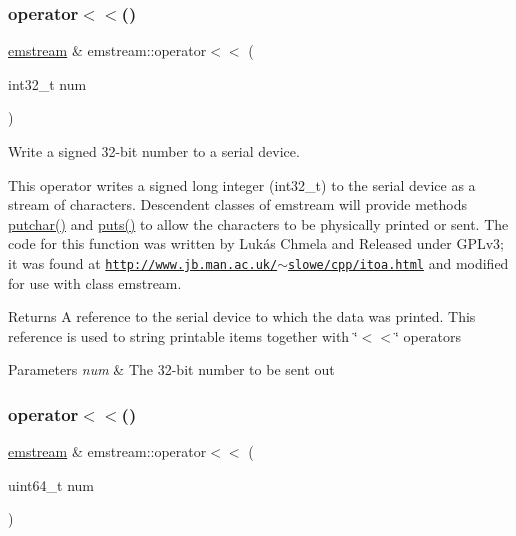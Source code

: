 \subsubsection{\texorpdfstring{operator$<$$<$()}{operator<<()}\hspace{0.1cm}{\footnotesize\ttfamily [8/14]}}
{\footnotesize\ttfamily \mbox{\hyperlink{classemstream}{emstream}} \& emstream\+::operator$<$$<$ (\begin{DoxyParamCaption}\item[{int32\+\_\+t}]{num }\end{DoxyParamCaption})}



Write a signed 32-\/bit number to a serial device. 

This operator writes a signed long integer ({\ttfamily int32\+\_\+t}) to the serial device as a stream of characters. Descendent classes of {\ttfamily emstream} will provide methods {\ttfamily \mbox{\hyperlink{classemstream_aa4dffc9aa58f601cc4153b4cbe65d757}{putchar()}}} and {\ttfamily \mbox{\hyperlink{classemstream_a1ad530cbebe6c54640c1db8c1b9afda2}{puts()}}} to allow the characters to be physically printed or sent. The code for this function was written by Lukás Chmela and Released under G\+P\+Lv3; it was found at \href{http://www.jb.man.ac.uk/~slowe/cpp/itoa.html}{\tt http\+://www.\+jb.\+man.\+ac.\+uk/$\sim$slowe/cpp/itoa.\+html} and modified for use with class {\ttfamily emstream}. \begin{DoxyReturn}{Returns}
A reference to the serial device to which the data was printed. This reference is used to string printable items together with \char`\"{}$<$$<$\char`\"{} operators 
\end{DoxyReturn}

\begin{DoxyParams}{Parameters}
{\em num} & The 32-\/bit number to be sent out \\
\hline
\end{DoxyParams}
\mbox{\label{classemstream_aad47341203535f0c3b8d34f63fa0723f}} 
\subsubsection{\texorpdfstring{operator$<$$<$()}{operator<<()}\hspace{0.1cm}{\footnotesize\ttfamily [9/14]}}
{\footnotesize\ttfamily \mbox{\hyperlink{classemstream}{emstream}} \& emstream\+::operator$<$$<$ (\begin{DoxyParamCaption}\item[{uint64\+\_\+t}]{num }\end{DoxyParamCaption})}



